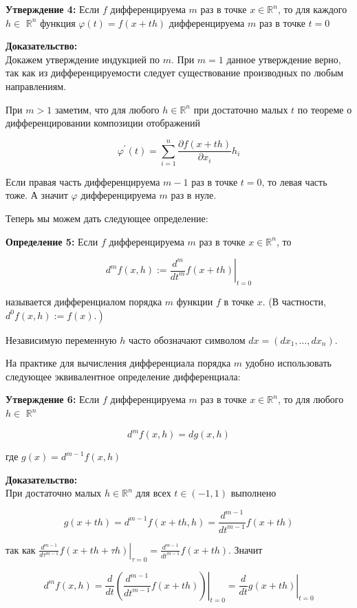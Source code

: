 \documentclass[a4paper,12pt]{article} %
\begin{document}
\textbf{Утверждение 4:} Если $f$ дифференцируема $m$ раз в точке $x \in \mathbb{R}^{n}$, то для каждого $h \in$ $\mathbb{R}^{n}$ функция $\varphi(t)=f(x+t h)$ дифференцируема $m$ раз в точке $t=0$

\textbf{Доказательство:}\\
Докажем утверждение индукцией по $m$. При $m=1$ данное утверждение верно, так как из дифференцируемости следует существование производных по любым направлениям.

При $m>1$ заметим, что для любого $h \in \mathbb{R}^{n}$ при достаточно малых $t$ по теореме о дифференцировании композиции отображений

$$
\varphi^{\prime}(t)=\sum_{i=1}^{n} \frac{\partial f(x+t h)}{\partial x_{i}} h_{i}
$$

Если правая часть дифференцируема $m-1$ раз в точке $t=0$, то левая часть тоже. А значит $\varphi$ дифференцируема $m$ раз в нуле.

Теперь мы можем дать следующее определение:

\textbf{Определение 5:} Если $f$ дифференцируема $m$ раз в точке $x \in \mathbb{R}^{n}$, то

$$
d^{m} f(x, h):=\left.\frac{d^{m}}{d t^{m}} f(x+t h)\right|_{t=0}
$$

называется дифференциалом порядка $m$ функции $f$ в точке $x$. (В частности, $\left.d^{0} f(x, h):=f(x).\right)$

Независимую переменную $h$ часто обозначают символом $d x=\left(d x_{1}, \ldots, d x_{n}\right)$.

На практике для вычисления дифференциала порядка $m$ удобно использовать следующее эквивалентное определение дифференциала:

\textbf{Утверждение 6:} Если $f$ дифференцируема $m$ раз в точке $x \in \mathbb{R}^{n}$, то для любого $h \in$ $\mathbb{R}^{n}$

$$
d^{m} f(x, h)=d g(x, h)
$$

где $g(x)=d^{m-1} f(x, h)$

\textbf{Доказательство:}\\
При достаточно малых $h \in \mathbb{R}^{n}$ для всех $t \in(-1,1)$ выполнено

$$
g(x+t h)=d^{m-1} f(x+t h, h)=\frac{d^{m-1}}{d t^{m-1}} f(x+t h)
$$

так как $\left.\frac{d^{m-1}}{d \tau^{m-1}} f(x+t h+\tau h)\right|_{\tau=0}=\frac{d^{m-1}}{d t^{m-1}} f(x+t h)$. Значит

$$
d^{m} f(x, h)=\left.\frac{d}{d t}\left(\frac{d^{m-1}}{d t^{m-1}} f(x+t h)\right)\right|_{t=0}=\left.\frac{d}{d t} g(x+t h)\right|_{t=0}
$$
\end{document}
